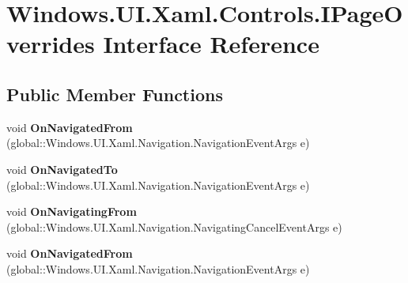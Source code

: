 \hypertarget{interface_windows_1_1_u_i_1_1_xaml_1_1_controls_1_1_i_page_overrides}{}\section{Windows.\+U\+I.\+Xaml.\+Controls.\+I\+Page\+Overrides Interface Reference}
\label{interface_windows_1_1_u_i_1_1_xaml_1_1_controls_1_1_i_page_overrides}
\subsection*{Public Member Functions}
\begin{DoxyCompactItemize}
\item 
\mbox{\label{interface_windows_1_1_u_i_1_1_xaml_1_1_controls_1_1_i_page_overrides_af0d15cae1c922566df43dad9237d536c}} 
void {\bfseries On\+Navigated\+From} (global\+::\+Windows.\+U\+I.\+Xaml.\+Navigation.\+Navigation\+Event\+Args e)
\item 
\mbox{\label{interface_windows_1_1_u_i_1_1_xaml_1_1_controls_1_1_i_page_overrides_a1b9b037b805024dc22a6292f5fac582e}} 
void {\bfseries On\+Navigated\+To} (global\+::\+Windows.\+U\+I.\+Xaml.\+Navigation.\+Navigation\+Event\+Args e)
\item 
\mbox{\label{interface_windows_1_1_u_i_1_1_xaml_1_1_controls_1_1_i_page_overrides_aa9a09a623757d484b26c44e93160e131}} 
void {\bfseries On\+Navigating\+From} (global\+::\+Windows.\+U\+I.\+Xaml.\+Navigation.\+Navigating\+Cancel\+Event\+Args e)
\item 
\mbox{\label{interface_windows_1_1_u_i_1_1_xaml_1_1_controls_1_1_i_page_overrides_af0d15cae1c922566df43dad9237d536c}} 
void {\bfseries On\+Navigated\+From} (global\+::\+Windows.\+U\+I.\+Xaml.\+Navigation.\+Navigation\+Event\+Args e)
\item 
\mbox{\label{interface_windows_1_1_u_i_1_1_xaml_1_1_controls_1_1_i_page_overrides_a1b9b037b805024dc22a6292f5fac582e}} 

\end{DoxyCompactItemize}
